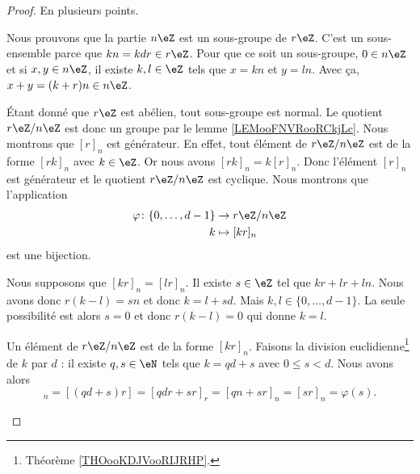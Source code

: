\begin{proof}
	En plusieurs points.
	\begin{subproof}
		Nous prouvons que la partie \( n\eZ\) est un sous-groupe de \( r\eZ\). C'est un sous-ensemble parce que \( kn=kdr\in r\eZ\). Pour que ce soit un sous-groupe, \( 0\in n\eZ\) et si \( x,y\in n\eZ\), il existe \( k,l\in \eZ\) tels que \( x=kn\) et \( y=ln\). Avec ça, \( x+y=(k+r)n\in n\eZ\).

		Étant donné que \( r\eZ\) est abélien, tout sous-groupe est normal. Le quotient \( r\eZ/n\eZ\) est donc un groupe par le lemme \ref{LEMooFNVRooRCkjLc}.
		Nous montrons que \( [r]_n\) est générateur. En effet, tout élément de \( r\eZ/n\eZ\) est de la forme \( [rk]_n\) avec \( k\in \eZ\). Or nous avons \( [rk]_n=k[r]_n\). Donc l'élément \( [r]_n\) est générateur et le quotient \( r\eZ/n\eZ\) est cyclique.
		Nous montrons que l'application
		\begin{equation}
			\begin{aligned}
				\varphi\colon \{ 0,\ldots,d-1 \} & \to r\eZ/n\eZ  \\
				k                                & \mapsto [kr]_n
			\end{aligned}
		\end{equation}
		est une bijection.
		\begin{subproof}
			\spitem[Injective]
			Nous supposons que \( [kr]_n=[lr]_n\). Il existe \( s\in \eZ\) tel que \( kr+lr+ln\). Nous avons donc \( r(k-l)=sn\) et donc \( k=l+sd\). Mais \( k,l\in \{ 0,\ldots,d-1 \}\). La seule possibilité est alors \( s=0\) et donc \( r(k-l)=0\) qui donne \( k=l\).

			\spitem[Surjective]
			Un élément de \( r\eZ/n\eZ\) est de la forme \( [kr]_n\). Faisons la division euclidienne\footnote{Théorème \ref{THOooKDJVooRIJRHP}.} de \( k\) par \( d\) : il existe \( q,s\in \eN\) tels que \( k=qd+s\) avec \( 0\leq s<d\). Nous avons alors
			\begin{equation}
				[kr]_n=[(qd+s)r]=[qdr+sr]_r=[qn+sr]_n=[sr]_n=\varphi(s).
			\end{equation}
		\end{subproof}
	\end{subproof}
\end{proof}


